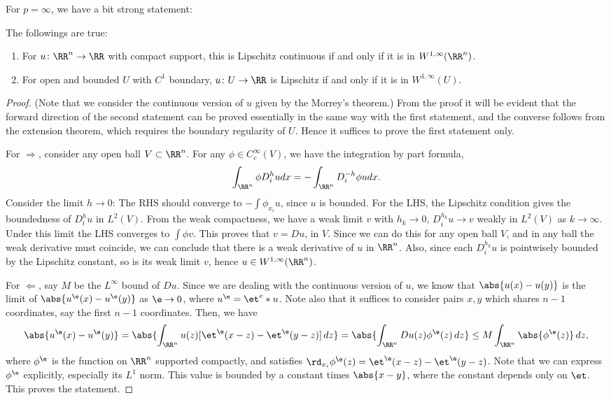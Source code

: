 \documentclass[a4paper]{amsart}
\begin{document}
For \(p = \infty\), we have a bit strong statement:
\begin{prop*} The followings are true: 
    \begin{enumerate}
        \item For \(u\colon \RR^n\to \RR\) with compact support, this is Lipschitz continuous if and only if it is in \(W^{1, \infty}(\RR^n)\). 
        \item For open and bounded \(U\) with \(C^1\) boundary, \(u\colon U\to \RR\) is Lipschitz if and only if it is in \(W^{1, \infty}(U)\).
    \end{enumerate}
\end{prop*}
\begin{proof}
    (Note that we consider the continuous version of \(u\) given by the Morrey's theorem.) 
    From the proof it will be evident that the forward direction of the second statement can be proved essentially in the same way with the first statement, and the converse follows from the extension theorem, which requires the boundary regularity of \(U\). 
    Hence it suffices to prove the first statement only. 

    For \(\Rightarrow\), consider any open ball \(V\subset \RR^n\). For any \(\phi\in C_c^\infty(V)\), we have the integration by part formula, 
    \[
        \int_{\RR^n} \phi D_i^h u dx = -\int_{\RR^n} D_i^{-h}\phi u dx.
    \]
    Consider the limit \(h\to 0\): The RHS should converge to \(-\int \phi_{x_i}u\), since \(u\) is bounded. 
    For the LHS, the Lipschitz condition gives the boundedness of \(D_i^h u\) in \(L^2(V)\). 
    From the weak compactness, we have a weak limit \(v\) with \(h_k\to 0\), \(D_i^{h_k} u\to v\) weakly in \(L^2(V)\) as \(k\to \infty\). 
    Under this limit the LHS converges to \(\int \phi v\). 
    This proves that \(v = Du\), in \(V\). 
    Since we can do this for any open ball \(V\), and in any ball the weak derivative must coincide, we can conclude that there is a weak derivative of \(u\) in \(\RR^n\). 
    Also, since each \(D_i^{h_k} u\) is pointwisely bounded by the Lipschitz constant, so is its weak limit \(v\), hence \(u\in W^{1, \infty}(\RR^n)\).

    For \(\Leftarrow\), say \(M\) be the \(L^\infty\) bound of \(Du\). 
    Since we are dealing with the continuous version of \(u\), we know that \(\abs{u(x)-u(y)}\) is the limit of \(\abs{u^\e(x)-u^\e(y)}\) as \(\e\to 0\), where \(u^\e = \et^e * u\). 
    Note also that it suffices to consider pairs \(x, y\) which shares \(n-1\) coordinates, say the first \(n-1\) coordinates. 
    Then, we have 
    \[
        \abs{u^\e(x)-u^\e(y)}
        = \abs{\int_{\RR^n} u(z)[\et^\e(x-z)-\et^\e(y-z)] \,dz}
        = \abs{\int_{\RR^n} Du(z)\phi^\e(z) \,dz}
        \le M \int_{\RR^n} \abs{\phi^\e(z)} \,dz,
    \]
    where \(\phi^\e\) is the function on \(\RR^n\) supported compactly, and satisfies \(\rd_{x_i}\phi^\e(z) = \et^\e(x-z)-\et^\e(y-z)\). 
    Note that we can express \(\phi^\e\) explicitly, especially its \(L^1\) norm. 
    This value is bounded by a constant times \(\abs{x-y}\), where the constant depends only on \(\et\). This proves the statement. 
\end{proof}
\end{document}
